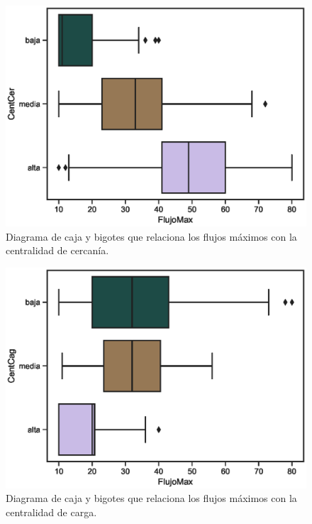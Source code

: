 \documentclass{article}
\begin{document}
\begin{center}
\begin{figure}[htbp]
\includegraphics[scale=0.6]{boxplot_FlujoMaxCentCer.eps}
\caption{Diagrama de caja y bigotes que relaciona los flujos máximos con la centralidad de cercanía.}
\label{fig21}
\end{figure}
\end{center}

\begin{center}
\begin{figure}[htbp]
\includegraphics[scale=0.6]{boxplot_FlujoMaxCentCag.eps}
\caption{Diagrama de caja y bigotes que relaciona los flujos máximos con la centralidad de carga.}
\label{fig22}
\end{figure}
\end{center}
\end{document}
